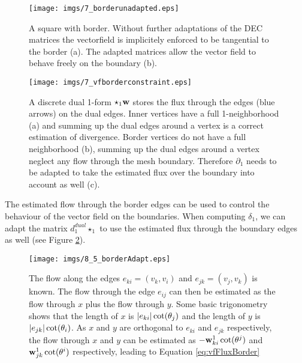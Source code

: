 \begin{figure}%
\texttt{[image: imgs/7\_borderunadapted.eps]}%
\caption{A square with border. Without further adaptations of the DEC matrices the vectorfield is implicitely enforced to be tangential to the border (a). The adapted matrices allow the vector field to behave freely on the boundary (b). }%
\label{fig:7_adaptedvsUnadapted}%
\end{figure}


\begin{figure}
\begin{center}
\texttt{[image: imgs/7\_vfborderconstraint.eps]}%
\end{center}
\caption{A discrete dual 1-form $\star_1\textbf{w}$ stores the flux through the edges (blue arrows) on the dual edges. Inner vertices have a full 1-neighborhood (a) and summing up the dual edges around a vertex is a correct estimation of divergence. Border vertices do not have a full neighborhood (b), summing up the dual edges around a vertex neglect any flow through the mesh boundary. Therefore $\partial_1$ needs to be adapted to take the estimated flux over the boundary into account as well (c).}%
\label{fig:vf_borderconstr}%
\end{figure}


The estimated flow through the border edges can be used to control the behaviour of the vector field on the boundaries. When computing $\delta_1$, we can adapt the matrix $d_1^{dual} \star_1$ to use the estimated flux through the boundary edges as well (see Figure \ref{fig:vf_borderconstr}).



\begin{figure}
\begin{center}
\texttt{[image: imgs/8\_5\_borderAdapt.eps]}
\end{center}
\caption{The flow along the edges $e_{ki}= (v_k,v_i)$ and $e_{jk} = (v_j, v_k)$ is known. The flow through the edge $e_{ij}$ can then be estimated as the flow through $x$ plus the flow through $y$. Some basic trigonometry shows that the length of $x$ is $\left| e_{ki} \right|\cot(\theta_j)$ and the length of $y$ is $\left| e_{jk} \right|\cot(\theta_i)$. As $x$ and $y$ are orthogonal to $e_{ki}$ and $e_{jk}$ respectively, the flow through $x$ and $y$ can be estimated as $-\textbf{w}^1_{ki} \cot(\theta^j)$ and $\textbf{w}^1_{jk} \cot(\theta^i)$ respectively, leading to Equation \ref{eq:vfFluxBorder}}
\label{fig:8_3_borderWeights}
\end{figure}


